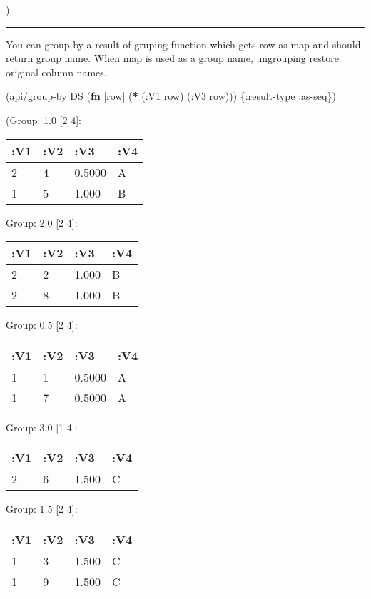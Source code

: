 \documentclass[]{article}
\newenvironment{Shaded}{\begin{snugshade}}{\end{snugshade}}
\newcommand{\KeywordTok}[1]{\textcolor[rgb]{0.13,0.29,0.53}{\textbf{#1}}}
\newcommand{\AttributeTok}[1]{\textcolor[rgb]{0.77,0.63,0.00}{#1}}
\newcommand{\NormalTok}[1]{#1}
\begin{document}
)

\begin{center}\rule{0.5\linewidth}{0.5pt}\end{center}

You can group by a result of gruping function which gets row as map and
should return group name. When map is used as a group name, ungrouping
restore original column names.

\begin{Shaded}
\begin{Highlighting}[]
\NormalTok{(api/group-by DS (}\KeywordTok{fn}\NormalTok{ [row] (}\KeywordTok{*}\NormalTok{ (}\AttributeTok{:V1}\NormalTok{ row)}
\NormalTok{                             (}\AttributeTok{:V3}\NormalTok{ row))) \{}\AttributeTok{:result-type} \AttributeTok{:as-seq}\NormalTok{\})}
\end{Highlighting}
\end{Shaded}

(Group: 1.0 {[}2 4{]}:

\begin{longtable}[]{@{}llll@{}}
\toprule
:V1 & :V2 & :V3 & :V4\tabularnewline
\midrule
\endhead
2 & 4 & 0.5000 & A\tabularnewline
1 & 5 & 1.000 & B\tabularnewline
\bottomrule
\end{longtable}

Group: 2.0 {[}2 4{]}:

\begin{longtable}[]{@{}llll@{}}
\toprule
:V1 & :V2 & :V3 & :V4\tabularnewline
\midrule
\endhead
2 & 2 & 1.000 & B\tabularnewline
2 & 8 & 1.000 & B\tabularnewline
\bottomrule
\end{longtable}

Group: 0.5 {[}2 4{]}:

\begin{longtable}[]{@{}llll@{}}
\toprule
:V1 & :V2 & :V3 & :V4\tabularnewline
\midrule
\endhead
1 & 1 & 0.5000 & A\tabularnewline
1 & 7 & 0.5000 & A\tabularnewline
\bottomrule
\end{longtable}

Group: 3.0 {[}1 4{]}:

\begin{longtable}[]{@{}llll@{}}
\toprule
:V1 & :V2 & :V3 & :V4\tabularnewline
\midrule
\endhead
2 & 6 & 1.500 & C\tabularnewline
\bottomrule
\end{longtable}

Group: 1.5 {[}2 4{]}:

\begin{longtable}[]{@{}llll@{}}
\toprule
:V1 & :V2 & :V3 & :V4\tabularnewline
\midrule
\endhead
1 & 3 & 1.500 & C\tabularnewline
1 & 9 & 1.500 & C\tabularnewline
\bottomrule
\end{longtable}
\end{document}

